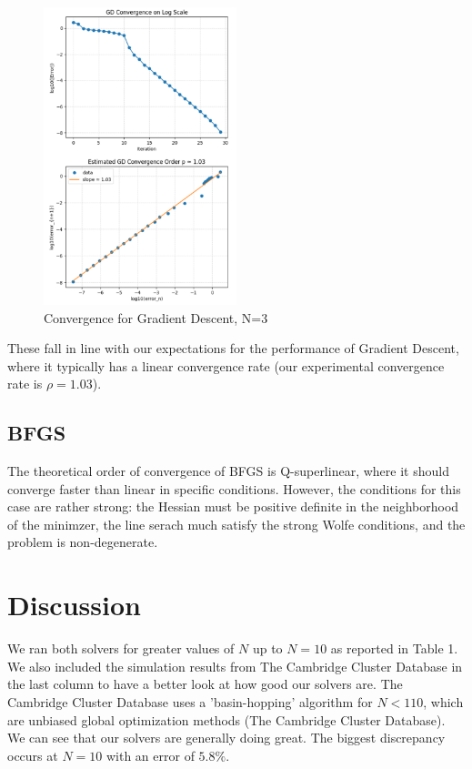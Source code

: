 \documentclass[11pt,onecolumn]{article}
\begin{document}
\begin{figure}[h]
  \centering
  \includegraphics[width=0.5\textwidth]{./GD_conv_uniform.png}
  \caption{Convergence for Gradient Descent, N=3}
\end{figure}


\noindent
These fall in line with our expectations for the performance of Gradient Descent, where it typically has a linear convergence rate (our experimental convergence rate is $\rho=1.03$).

\subsection{BFGS}

The theoretical order of convergence of BFGS is Q-superlinear, where it should converge faster than linear in specific conditions. However, the conditions for this case are rather strong: the Hessian must be positive definite in the neighborhood of the minimzer, the line serach much satisfy the strong Wolfe conditions, and the problem is non-degenerate. 

\section{Discussion}
We ran both solvers for greater values of $N$ up to $N=10$ as reported in Table 1. We also included the simulation results from The Cambridge Cluster Database in the last column to have a better look at how good our solvers are. The Cambridge Cluster Database uses a 'basin-hopping' algorithm for $N<110$, which are unbiased global optimization methods (The Cambridge Cluster Database). We can see that our solvers are generally doing great. The biggest discrepancy occurs at $N=10$ with an error of $5.8\%$.
\end{document}
